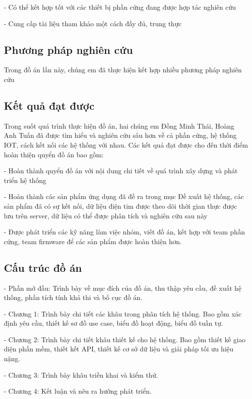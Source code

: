 - Có thể kết hợp tốt với các thiết bị phần cứng đang được hợp tác nghiên cứu

- Cung cấp tài liệu tham khảo một cách đầy đủ, trung thực

\subsection*{Phương pháp nghiên cứu}
Trong đồ án lần này, chúng em đã thực hiện kết hợp nhiều phương pháp nghiên cứu

\subsection*{Kết quả đạt được}

Trong suốt quá trình thực hiện đồ án, hai chúng em Đồng Minh Thái, Hoàng Anh Tuấn đã được tìm hiểu và nghiên cứu sâu hơn về cả phần cứng,
hệ thống IOT, cách kết nối các hệ thống với nhau. Các kết quả đạt được cho đến thời điểm hoàn thiện quyển đồ án bao gồm:

- Hoàn thành quyển đồ án với nội dung chi tiết về quá trình xây dựng và phát triển hệ thống

- Hoàn thành các sản phẩm ứng dụng đã đề ra trong mục Đề xuất hệ thống, các sản phẩm đã có sự kết nối, dữ liệu điện tim được theo dõi
thời gian thực được lưu trên server, dữ liệu có thể được phân tích và nghiên cứu sau này

- Được phát triển các kỹ năng làm việc nhóm, viết đồ án, kết hợp với team phần cứng, team firmware để các sản phẩm được hoàn thiện hơn.

\subsection*{Cấu trúc đồ án}
- Phần mở đầu: Trình bày về mục đích của đồ án, thu thập yêu cầu, đề xuất hệ thống, phần tích tính khả thi và bố cục đồ án.

- Chương 1: Trình bày chi tiết các khâu trong phân tích hệ thống. 
Bao gồm xác định yêu cầu, thiết kế sơ đồ use case, biểu đồ hoạt động, biểu đồ tuần tự.

- Chương 2: Trình bày chi tiết khâu thiết kế cho hệ thống. Bao gồm thiết kế giao diện phần mềm, thiết kết API, thiết kế cơ sở dữ liệu
và giải pháp tối ưu hiệu nặng.

- Chương 3: Trình bày khâu triền khai và kiểm thử.

- Chương 4: Kết luận và nêu ra hướng phát triển.

\cleardoublepage

